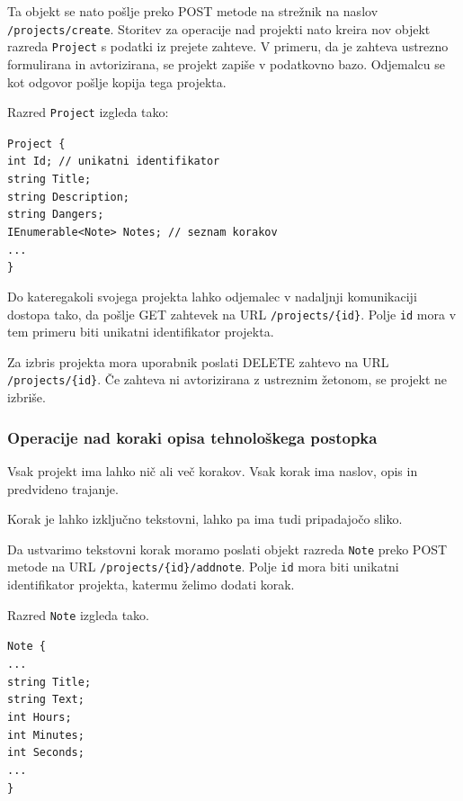 \documentclass[a4paper, 12pt]{book}
\begin{document}
\noindent Ta objekt se nato pošlje preko POST metode na strežnik na naslov \texttt{/projects/create}.
Storitev za operacije nad projekti nato kreira nov objekt razreda \texttt{Project} s podatki iz prejete zahteve.
V primeru, da je zahteva ustrezno formulirana in avtorizirana, se projekt zapiše v podatkovno bazo.
Odjemalcu se kot odgovor pošlje kopija tega projekta.

\noindent Razred \texttt{Project} izgleda tako:

\noindent \texttt{Project \{ \\
int Id; // unikatni identifikator \\
string Title; \\
string Description; \\
string Dangers; \\
IEnumerable<Note> Notes; // seznam korakov \\
... \\
\}
}


Do kateregakoli svojega projekta lahko odjemalec v nadaljnji komunikaciji dostopa tako, da pošlje GET zahtevek na URL \texttt{/projects/\{id\}}.
Polje \texttt{id} mora v tem primeru biti unikatni identifikator projekta.

Za izbris projekta mora uporabnik poslati DELETE zahtevo na URL \texttt{/projects/\{id\}}.
Če zahteva ni avtorizirana z ustreznim žetonom, se projekt ne izbriše.

\subsubsection{Operacije nad koraki opisa tehnološkega postopka}

Vsak projekt ima lahko nič ali več korakov.
Vsak korak ima naslov, opis in predvideno trajanje.

Korak je lahko izključno tekstovni, lahko pa ima tudi pripadajočo sliko.

Da ustvarimo tekstovni korak moramo poslati objekt razreda \texttt{Note} preko POST metode na URL \texttt{/projects/\{id\}/addnote}.
Polje \texttt{id} mora biti unikatni identifikator projekta, katermu želimo dodati korak.

\noindent Razred \texttt{Note} izgleda tako.

\noindent \texttt{Note \{ \\
...\\ 
string Title; \\
string Text; \\
int Hours; \\
int Minutes; \\
int Seconds; \\
...\\ 
\} }
\end{document}
